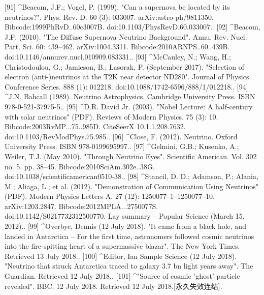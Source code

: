 [91]
^Beacom, J.F.; Vogel, P. (1999). "Can a supernova be located by its neutrinos?". Phys. Rev. D. 60 (3): 033007. arXiv:astro-ph/9811350. Bibcode:1999PhRvD..60c3007B. doi:10.1103/PhysRevD.60.033007..
[92]
^Beacom, J.F. (2010). "The Diffuse Supernova Neutrino Background". Annu. Rev. Nucl. Part. Sci. 60: 439–462. arXiv:1004.3311. Bibcode:2010ARNPS..60..439B. doi:10.1146/annurev.nucl.010909.083331..
[93]
^McCauley, N.; Wang, H.; Christodoulou, G.; Jamieson, B.; Lasorak, P. (September 2017). "Selection of electron (anti-)neutrinos at the T2K near detector ND280". Journal of Physics. Conference Series. 888 (1): 012218. doi:10.1088/1742-6596/888/1/012218..
[94]
^J.N. Bahcall (1989). Neutrino Astrophysics. Cambridge University Press. ISBN 978-0-521-37975-5..
[95]
^D.R. David Jr. (2003). "Nobel Lecture: A half-century with solar neutrinos" (PDF). Reviews of Modern Physics. 75 (3): 10. Bibcode:2003RvMP...75..985D. CiteSeerX 10.1.1.208.7632. doi:10.1103/RevModPhys.75.985..
[96]
^Close, F. (2012). Neutrino. Oxford University Press. ISBN 978-0199695997..
[97]
^Gelmini, G.B.; Kusenko, A.; Weiler, T.J. (May 2010). "Through Neutrino Eyes". Scientific American. Vol. 302 no. 5. pp. 38–45. Bibcode:2010SciAm.302e..38G. doi:10.1038/scientificamerican0510-38..
[98]
^Stancil, D. D.; Adamson, P.; Alania, M.; Aliaga, L.; et al. (2012). "Demonstration of Communication Using Neutrinos" (PDF). Modern Physics Letters A. 27 (12): 1250077–1–1250077–10. arXiv:1203.2847. Bibcode:2012MPLA...2750077S. doi:10.1142/S0217732312500770. Lay summary – Popular Science (March 15, 2012)..
[99]
^Overbye, Dennis (12 July 2018). "It came from a black hole, and landed in Antarctica – For the first time, astronomers followed cosmic neutrinos into the fire-spitting heart of a supermassive blazar". The New York Times. Retrieved 13 July 2018..
[100]
^Editor, Ian Sample Science (12 July 2018). "Neutrino that struck Antarctica traced to galaxy 3.7 bn light years away". The Guardian. Retrieved 12 July 2018..
[101]
^"Source of cosmic 'ghost' particle revealed". BBC. 12 July 2018. Retrieved 12 July 2018.[永久失效连结].